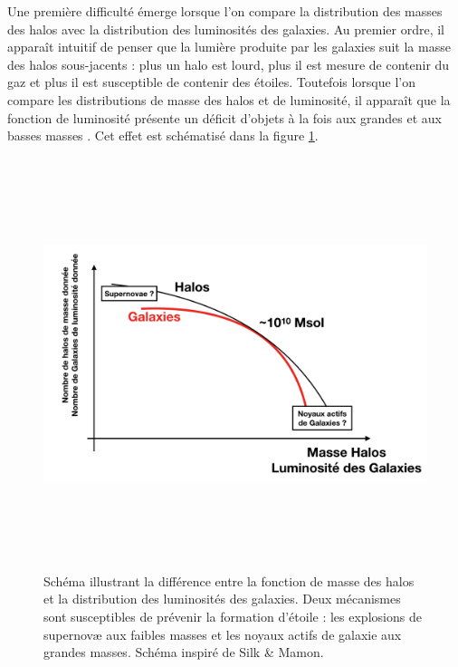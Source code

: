 Une première difficulté émerge lorsque l'on compare la distribution des masses des halos avec la distribution des luminosités des galaxies. Au premier ordre, il apparaît intuitif de penser que la lumière produite par les galaxies suit la masse des halos sous-jacents : plus un halo est lourd, plus il est mesure de contenir du gaz et plus il est susceptible de contenir des étoiles. Toutefois lorsque l'on compare les distributions de masse des halos et de luminosité, il apparaît que la fonction de luminosité présente un déficit d'objets à la fois aux grandes et aux basses masses . Cet effet est schématisé dans la figure \ref{f:silkmamon}.
\begin{figure}[htbp]
	\centering
		\includegraphics[height=12cm]{figs/SilkMamon.png}
	\caption[Schéma illustrant la différence entre la fonction de masse des halos et la distribution des luminosités des galaxies]{Schéma illustrant la différence entre la fonction de masse des halos et la distribution des luminosités des galaxies. Deux mécanismes sont susceptibles de prévenir la formation d'étoile : les explosions de supernovæ aux faibles masses et les noyaux actifs de galaxie aux grandes masses.  Schéma inspiré de Silk \& Mamon. } 
	\label{f:silkmamon}
\end{figure}
